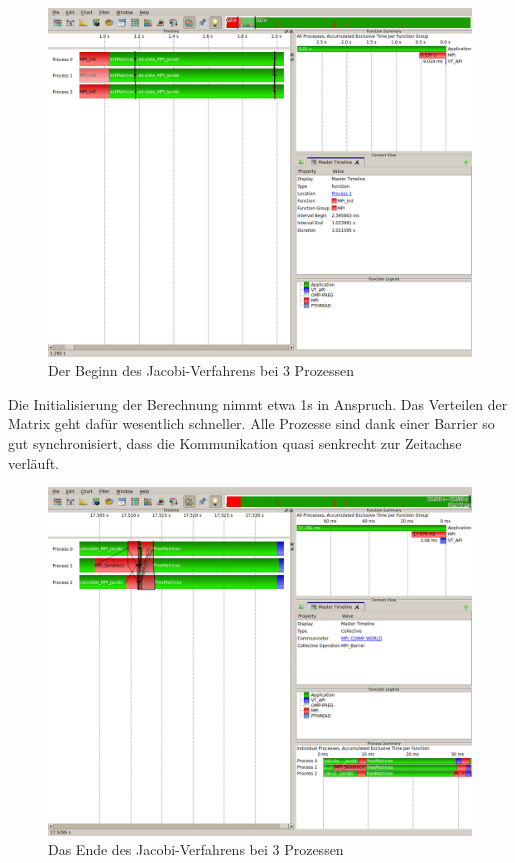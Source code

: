 \documentclass[a4paper,12pt]{scrartcl}
\begin{document}
\begin{figure}[hr!]
 \includegraphics[scale=0.45]{./3_2_JA/Start.png}
 \caption{Der Beginn des Jacobi-Verfahrens bei 3 Prozessen}
\end{figure}
Die Initialisierung der Berechnung nimmt etwa 1s in Anspruch. Das Verteilen der Matrix geht dafür wesentlich schneller. Alle Prozesse sind dank einer Barrier so gut synchronisiert, dass die Kommunikation quasi senkrecht zur Zeitachse verläuft.
\FloatBarrier
\begin{figure}[hr!]
 \includegraphics[scale=0.45]{./3_2_JA/End.png}
 \caption{Das Ende des Jacobi-Verfahrens bei 3 Prozessen}
\end{figure}
\end{document}
